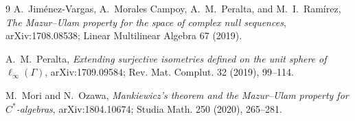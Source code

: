 \documentclass[11pt]{article}
\newcommand{\linf}{\ell_\infty}
\begin{document}
\begin{raggedright}
\begin{thebibliography}{9}
A.~Jim\'enez-Vargas, A.~Morales Campoy, A.~M.~Peralta, and M.~I.~Ram\'irez,
\emph{The Mazur--Ulam property for the space of complex null sequences},
arXiv:1708.08538; Linear Multilinear Algebra 67 (2019).

A.~M.~Peralta,
\emph{Extending surjective isometries defined on the unit sphere of
$\linf(\Gamma)$}, arXiv:1709.09584; Rev. Mat. Complut. 32 (2019), 99--114.

M.~Mori and N.~Ozawa,
\emph{Mankiewicz's theorem and the Mazur--Ulam property for $C^*$-algebras},
arXiv:1804.10674; Studia Math. 250 (2020), 265--281.
\end{thebibliography}
\end{raggedright}
\end{document}
